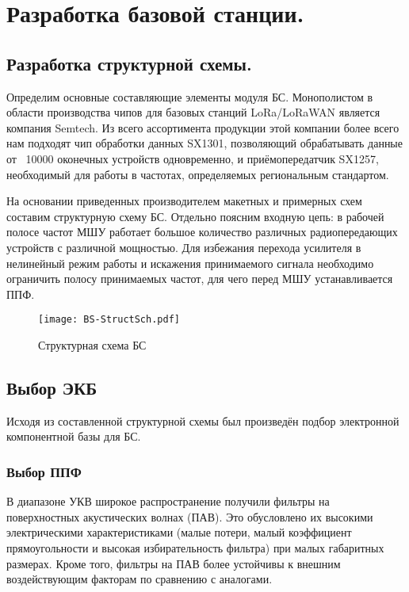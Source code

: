 \section{Разработка базовой станции.}
\subsection{Разработка структурной схемы.}
Определим основные составляющие элементы модуля БС. Монополистом в области производства чипов для базовых станций LoRa/LoRaWAN является компания Semtech. Из всего ассортимента продукции этой компании более всего нам подходят чип обработки данных SX1301, позволяющий обрабатывать данные от ~10000 оконечных устройств одновременно\cite{KimLee2020}, и приёмопередатчик SX1257, необходимый для работы в частотах, определяемых региональным стандартом.

На основании приведенных производителем макетных и примерных схем составим структурную схему БС. Отдельно поясним входную цепь: в рабочей полосе частот МШУ работает большое количество различных радиопередающих устройств с различной мощностью. Для избежания перехода усилителя в нелинейный режим работы и искажения принимаемого сигнала необходимо ограничить полосу принимаемых частот, для чего перед МШУ устанавливается ППФ. 

\begin{figure}[H]
	\centering
	\texttt{[image: BS-StructSch.pdf]}
	\caption{Структурная схема БС}%
	\label{fig:BS-StructSch}
\end{figure}


\subsection{Выбор ЭКБ}
Исходя из составленной структурной схемы был произведён подбор электронной компонентной базы для БС.

\subsubsection{Выбор ППФ}

В диапазоне УКВ широкое распространение получили фильтры на поверхностных акустических волнах (ПАВ). Это обусловлено их высокими электрическими характеристиками (малые потери, малый коэффициент прямоугольности и высокая избирательность фильтра) при малых габаритных размерах. Кроме того, фильтры на ПАВ более устойчивы к внешним воздействующим факторам по сравнению с аналогами.

